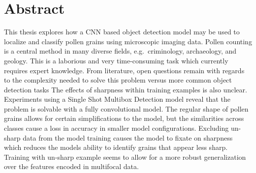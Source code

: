 \chapter*{Abstract}
This thesis explores how a CNN based object detection model may be used to localize and classify pollen grains using microscopic imaging data.
Pollen counting is a central method in many diverse fields, e.g.\ criminology, archaeology, and geology.
This is a laborious and very time-consuming task which currently requires expert knowledge.
From literature, open questions remain with regards to the complexity needed to solve this problem versus more common object detection tasks
The effects of sharpness within training examples is also unclear.
Experiments using a Single Shot Multibox Detection model reveal that the problem is solvable with a fully convolutional model. 
The regular shape of pollen grains allows for certain simplifications to the model, but the similarities across classes cause a loss in accuracy in smaller model configurations.
Excluding un-sharp data from the model training causes the model to fixate on sharpness which reduces the models ability to identify grains that appear less sharp.
Training with un-sharp example seems to allow for a more robust generalization over the features encoded in multifocal data.


